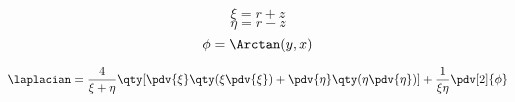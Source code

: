 
\begin{equation}
\xi = r + z
\end{equation}
\begin{equation}
\eta = r - z
\end{equation}
\begin{equation}
\phi = \Arctan(y, x)
\end{equation}

\begin{equation}
\laplacian = \frac{4}{\xi + \eta} \qty[\pdv{\xi}\qty(\xi\pdv{\xi}) + \pdv{\eta}\qty(\eta\pdv{\eta})] + \frac{1}{\xi\eta}\pdv[2]{\phi}
\end{equation}

